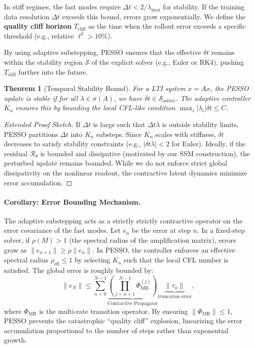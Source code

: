\documentclass{article}
\theoremstyle{plain}
\newtheorem{theorem}{Theorem}
\theoremstyle{definition}
\theoremstyle{remark}
\begin{document}
In stiff regimes, the fast modes require $\Delta t < 2/\lambda_{\max}$ for stability. If the training data resolution $\Delta t$ exceeds this bound, errors grow exponentially. We define the \textbf{quality cliff horizon} $T_{\text{cliff}}$ as the time when the rollout error exceeds a specific threshold (e.g., relative $\ell^2 > 10\%$).

By using adaptive substepping, PESSO ensures that the effective $\delta t$ remains within the stability region $\mathcal{S}$ of the explicit solver (e.g., Euler or RK4), pushing $T_{\text{cliff}}$ further into the future.

\begin{theorem}[Temporal Stability Bound]
For a LTI system $\dot{x} = Ax$, the PESSO update is stable if for all $\lambda \in \sigma(A)$, we have $\delta t \in \mathcal{S}_{\text{solver}}$. The adaptive controller $K_n$ ensures this by bounding the local CFL-like condition $\max_i |\lambda_i| \delta t \le C$.
\end{theorem}

\begin{proof}[Extended Proof Sketch]
If $\Delta t$ is large such that $\Delta t \lambda$ is outside stability limits, PESSO partitions $\Delta t$ into $K_n$ substeps. Since $K_n$ scales with stiffness, $\delta t$ decreases to satisfy stability constraints (e.g., $|\delta t \lambda| < 2$ for Euler).
Ideally, if the residual $\mathcal{R}_\theta$ is bounded and dissipative (motivated by our SSM construction), the perturbed update remains bounded. While we do not enforce strict global dissipativity on the nonlinear readout, the contractive latent dynamics minimize error accumulation.
\end{proof}

\paragraph{Corollary: Error Bounding Mechanism.}
The adaptive substepping acts as a strictly strictly contractive operator on the error covariance of the fast modes. Let $e_n$ be the error at step $n$. In a fixed-step solver, if $\rho(M) > 1$ (the spectral radius of the amplification matrix), errors grow as $\|e_{n+1}\| \ge \rho \|e_n\|$. In PESSO, the controller enforces an effective spectral radius $\rho_{\text{eff}} \le 1$ by selecting $K_n$ such that the local CFL number is satisfied. The global error is roughly bounded by:
\begin{equation}
    \|e_N\| \le \sum_{n=0}^{N-1} \underbrace{\left(\prod_{j=n+1}^{N-1} \Phi_{\text{MR}}^{(j)} \right)}_{\text{Contractive Propagator}} \underbrace{\|\tau_n\|}_{\text{truncation error}},
\end{equation}
where $\Phi_{\text{MR}}$ is the multi-rate transition operator. By ensuring $\|\Phi_{\text{MR}}\| \le 1$, PESSO prevents the catastrophic ``quality cliff'' explosion, linearizing the error accumulation proportional to the number of steps rather than exponential growth.
\end{document}
